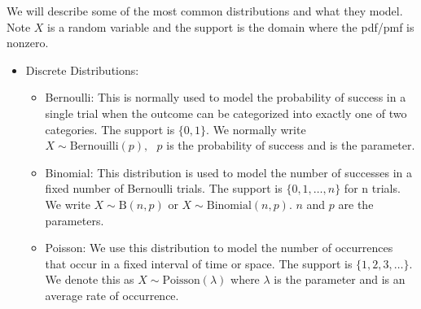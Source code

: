 We will describe some of the most common distributions and what they model. Note $X$ is a random variable and the support is the domain where the pdf/pmf is nonzero.
\begin{itemize}
    \item Discrete Distributions:
    \begin{itemize}
        \item Bernoulli: This is normally used to model the probability of success in a single trial when the outcome can be categorized into exactly one of two categories.
        The support is $\{0,1\}$.
        We normally write $X \sim\text{Bernouilli}(p),\text{ }p$ is the probability of success and is the parameter.
        \item Binomial: This distribution is used to model the number of successes in a fixed number of Bernoulli trials.
        The support is $\{0,1,\ldots,n\}$ for n trials.
        We write $X\sim\text{B}(n,p)$ or $X\sim\text{Binomial}(n,p)$.
        $n$ and $p$ are the parameters.
        \item Poisson: We use this distribution to model the number of occurrences that occur in a fixed interval of time or space.
        The support is $\{1,2,3,\ldots \}$.
        We denote this as $X\sim\text{Poisson}(\lambda)$ where $\lambda$ is the parameter and is an average rate of occurrence.
    \end{itemize}


\end{itemize}
